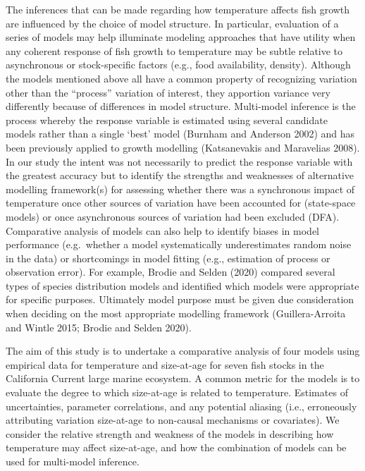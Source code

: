 \documentclass[
]{article}
\begin{document}
The inferences that can be made regarding how temperature affects fish
growth are influenced by the choice of model structure. In particular,
evaluation of a series of models may help illuminate modeling approaches
that have utility when any coherent response of fish growth to
temperature may be subtle relative to asynchronous or stock-specific
factors (e.g., food availability, density). Although the models
mentioned above all have a common property of recognizing variation
other than the ``process'' variation of interest, they apportion
variance very differently because of differences in model structure.
Multi-model inference is the process whereby the response variable is
estimated using several candidate models rather than a single `best'
model (Burnham and Anderson 2002) and has been previously applied to
growth modelling (Katsanevakis and Maravelias 2008). In our study the
intent was not necessarily to predict the response variable with the
greatest accuracy but to identify the strengths and weaknesses of
alternative modelling framework(s) for assessing whether there was a
synchronous impact of temperature once other sources of variation have
been accounted for (state-space models) or once asynchronous sources of
variation had been excluded (DFA). Comparative analysis of models can
also help to identify biases in model performance (e.g.~whether a model
systematically underestimates random noise in the data) or shortcomings
in model fitting (e.g., estimation of process or observation error). For
example, Brodie and Selden (2020) compared several types of species
distribution models and identified which models were appropriate for
specific purposes. Ultimately model purpose must be given due
consideration when deciding on the most appropriate modelling framework
(Guillera-Arroita and Wintle 2015; Brodie and Selden 2020).

The aim of this study is to undertake a comparative analysis of four
models using empirical data for temperature and size-at-age for seven
fish stocks in the California Current large marine ecosystem. A common
metric for the models is to evaluate the degree to which size-at-age is
related to temperature. Estimates of uncertainties, parameter
correlations, and any potential aliasing (i.e., erroneously attributing
variation size-at-age to non-causal mechanisms or covariates). We
consider the relative strength and weakness of the models in describing
how temperature may affect size-at-age, and how the combination of
models can be used for multi-model inference.
\end{document}
